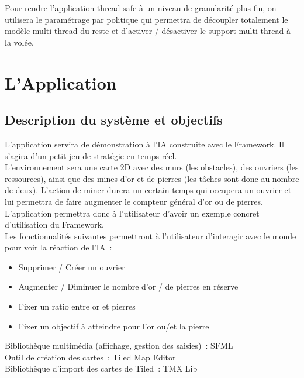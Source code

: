 Pour rendre l'application thread-safe à un niveau de granularité plus fin, on utilisera le paramétrage par politique qui permettra de découpler totalement le modèle multi-thread du reste et d'activer / désactiver le support multi-thread à la volée.

\section{L’Application}

\subsection{Description du système et objectifs}

L'application servira de démonstration à l'IA construite avec le Framework. Il s'agira d'un petit jeu de stratégie en temps réel.\\

L'environnement sera une carte 2D avec des murs (les obstacles), des ouvriers (les ressources), ainsi que des mines d'or et de pierres (les tâches sont donc au nombre de deux). L'action de miner durera un certain temps qui occupera un ouvrier et lui permettra de faire augmenter le compteur général d'or ou de pierres.\\

L'application permettra donc à l'utilisateur d'avoir un exemple concret d'utilisation du Framework.\\

Les fonctionnalités suivantes permettront à l'utilisateur d'interagir avec le monde pour voir la réaction de l'IA~:
\begin{itemize}
\item Supprimer / Créer un ouvrier
\item Augmenter / Diminuer le nombre d'or / de pierres en réserve
\item Fixer un ratio entre or et pierres
\item Fixer un objectif à atteindre pour l'or ou/et la pierre
\end{itemize} \vspace{4mm}

\noindent Bibliothèque multimédia (affichage, gestion des saisies)~: SFML\\
Outil de création des cartes~: Tiled Map Editor\\
Bibliothèque d'import des cartes de Tiled~: TMX Lib

